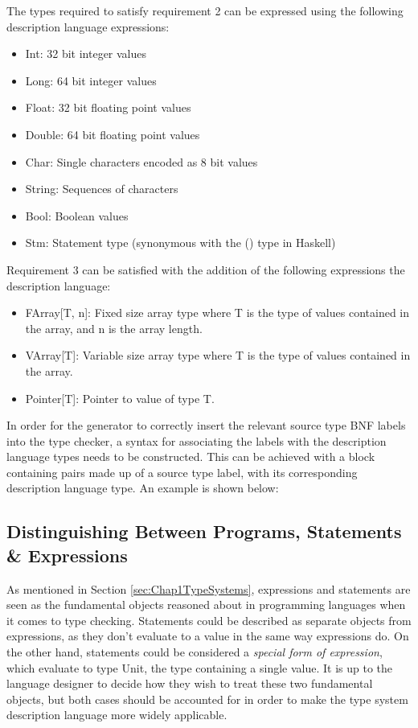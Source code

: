 \documentclass{UoYCSproject}
\begin{document}
The types required to satisfy requirement 2 can be expressed using the following
description language expressions:
\begin{itemize}
    \item {\ttfamily Int}: 32 bit integer values
    \item {\ttfamily Long}: 64 bit integer values
    \item {\ttfamily Float}: 32 bit floating point values
    \item {\ttfamily Double}: 64 bit floating point values
    \item {\ttfamily Char}: Single characters encoded as 8 bit values
    \item {\ttfamily String}: Sequences of characters
    \item {\ttfamily Bool}: Boolean values
    \item {\ttfamily Stm}: Statement type (synonymous with the {\ttfamily ()}
        type in Haskell)
\end{itemize}
Requirement 3 can be satisfied with the addition of the following expressions
the description language:
\begin{itemize}
    \item {\ttfamily FArray[T, n]}: Fixed size array type where {\ttfamily T} is 
        the type of values contained in the array, and {\ttfamily n} is the 
        array length.
    \item {\ttfamily VArray[T]}: Variable size array type where {\ttfamily T} is
        the type of values contained in the array.
    \item {\ttfamily Pointer[T]}: Pointer to value of type T.
\end{itemize}

In order for the generator to correctly insert the relevant source type BNF labels into the type checker, a syntax for associating the labels
with the description language types needs to be constructed. 
This can be achieved with a block containing pairs made up of a source type
label, with its corresponding description language type. An example is shown 
below:


\subsection{Distinguishing Between Programs, Statements \& Expressions}
As mentioned in Section \ref{sec:Chap1TypeSystems}, expressions and statements 
are seen as the fundamental objects reasoned about in programming languages when 
it comes to type checking. Statements could be described as separate objects from 
expressions, as they don't evaluate to a value in the same way expressions do. On
the other hand, statements could be considered a \textit{special form of
    expression}, which evaluate to type {\ttfamily Unit}, the type containing
a single value. It is up to the language designer to decide how they wish to
treat these two fundamental objects, but both cases should be accounted for
in order to make the type system description language more widely applicable.
\end{document}
